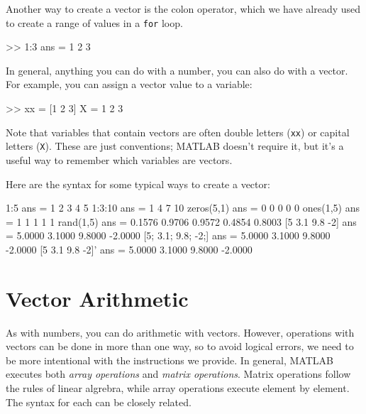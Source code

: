 Another way to create a vector is the colon operator, which we have already used to create a range of values in a \lstinline{for} loop.

\begin{code}
>> 1:3
ans = 1     2     3
\end{code}

In general, anything you can do with a number, you can also do with
a vector.  For example, you can assign a vector value to a variable:

\begin{code}
>> xx = [1 2 3]
X = 1     2     3
\end{code}

Note that variables that contain vectors are often double letters (\lstinline{xx}) or capital letters (\lstinline{X}).
These are just conventions; MATLAB doesn't require it, but it's a useful way to remember which variables are vectors.

Here are the syntax for some typical ways to create a vector:
\begin{code}
     1:5
     ans =
          1     2     3     4     5
     1:3:10
     ans =
          1     4     7    10
     zeros(5,1)
     ans =
          0
          0
          0
          0
          0
     ones(1,5)
     ans =
          1     1     1     1     1
     rand(1,5)
     ans =
         0.1576    0.9706    0.9572    0.4854    0.8003
     [5 3.1 9.8 -2]
     ans =
         5.0000    3.1000    9.8000   -2.0000
     [5; 3.1; 9.8; -2;]
     ans =
         5.0000
         3.1000
         9.8000
        -2.0000
     [5 3.1 9.8 -2]'
     ans =
         5.0000
         3.1000
         9.8000
        -2.0000
\end{code}


\section{Vector Arithmetic}
\label{elementwise}


As with numbers, you can do arithmetic with vectors.  However, operations with vectors can be done in more than one way, so to avoid logical errors, we need to be more intentional with the instructions we provide.  In general, MATLAB executes both \emph{array operations} and \emph{matrix operations}.   Matrix operations follow the rules of linear algrebra, while array operations execute element by element.  The syntax for each can be closely related.


